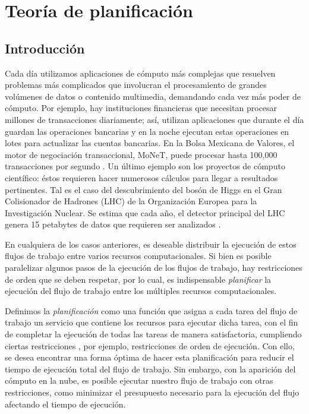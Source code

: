 \chapter{Teoría de planificación}

\section{Introducción}
\label{secc:intro}

Cada día utilizamos aplicaciones de cómputo más complejas que resuelven problemas más complicados que involucran el procesamiento de grandes volúmenes de datos o contenido multimedia, demandando cada vez más poder de cómputo. Por ejemplo, hay instituciones financieras que necesitan procesar millones de transacciones diariamente; así, utilizan aplicaciones que durante el día guardan las operaciones bancarias y en la noche ejecutan estas operaciones en lotes para actualizar las cuentas bancarias. En la Bolsa Mexicana de Valores, el motor de negociación transaccional, MoNeT, puede procesar hasta 100,000 transacciones por segundo \cite{bmv2012informe}. Un último ejemplo son los proyectos de cómputo científico: éstos requieren hacer numerosos cálculos para llegar a resultados pertinentes. Tal es el caso del descubrimiento del bosón de Higgs en el Gran Colisionador de Hadrones (LHC) de la Organización Europea para la Investigación Nuclear. Se estima que cada año, el detector principal del LHC genera 15 petabytes de datos que requieren ser analizados \cite{shiers2007worldwide}. %

En cualquiera de los casos anteriores, es deseable distribuir la ejecución de estos flujos de trabajo entre varios recursos computacionales. Si bien es posible paralelizar algunos pasos de la ejecución de los flujos de trabajo, hay restricciones de orden que se deben respetar, por lo cual, es indispensable \emph{planificar} la ejecución del flujo de trabajo entre los múltiples recursos computacionales.

Definimos la \emph{planificación} como una función que asigna a cada tarea del flujo de trabajo un servicio que contiene los recursos para ejecutar dicha tarea, con el fin de completar la ejecución de todas las tareas de manera satisfactoria, cumpliendo ciertas restricciones \cite{wieczorek2009towards}, por ejemplo, restricciones de orden de ejecución. Con ello, se desea encontrar una forma óptima de hacer esta planificación para reducir el tiempo de ejecución total del flujo de trabajo. Sin embargo, con la aparición del cómputo en la nube, es posible ejecutar nuestro flujo de trabajo con otras restricciones, como minimizar el presupuesto necesario para la ejecución del flujo afectando el tiempo de ejecución.

